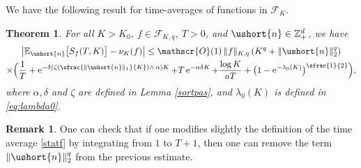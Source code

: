 \documentclass[10pt]{amsart}
\newcommand{\Psfrac}[2]{(\sfrac{#1}{#2})}
\newcommand{\scaleto}[2]{#1}
\let\mathcal\mathscr
\numberwithin{equation}{section}
\theoremstyle{plain}
\newtheorem{theorem}{Theorem}[section]
\theoremstyle{definition}
\newtheorem{remark}{Remark}[section]
\newcommand{\E}{{\mathbb{E}}}
\newcommand{\zentiers}{{\mathbb{Z}}}
\newcommand{\domaine}{\zentiers_{+}^{d}}
\newcommand{\Oun}{\mathcal{O}(1)}
\newcommand{\sK}{K}
\newcommand{\vecn}{\ushort{n}}
\newcommand{\nuk}{\nu_{K}}\let\snuk\nuk
\newcommand{\e}{\operatorname{e}}
\newcommand{\normdeux}[1]{\|#1\|_{2}}\let\snormdeux\normdeux
\begin{document}
We have the following result for time-averages of functions in $\mathscr{F}\!_{\sK}$.
\begin{theorem}\label{pseudoergod}
For all $K>K_0$, $f\in\mathscr{F}\!_{\sK,q}$, $T>0$, and $\vecn\in \domaine$, we have
\begin{multline*}
\left|\E_{\vecn}\bigl[S_{f}(T,K)\bigr]-\nuk(f)\right|
\leq \Oun\, \|f\|_{\sK,q}\,(K^{q}+\normdeux{\vecn}^{\scaleto{q}{3.6pt}})\\
\times \Bigl(\frac{1}{T} + \e^{-\delta\left(\zeta\Psfrac{\|\vecn\|_{1}}{K}\wedge\,\alpha\right)K}
+T\e^{-\alpha\delta K}+\frac{\log K}{a T}+ \bigl(1-\e^{-\lambda_0(K)}\bigr)^{\sfrac{1}{2}} \Bigr),
\end{multline*}
where $\alpha, \delta$ and $\zeta$ are defined in Lemma \ref{sortpas}, and $\lambda_0(K)$ is defined in \eqref{eq:lambda0}.
\end{theorem}
\begin{remark}
One can check that if one modifies slightly the definition of the time average \eqref{statf} by integrating from $1$ to $T+1$,
then one can remove the term $\normdeux{\vecn}^{q}$ from the previous estimate.
\end{remark}
\end{document}
